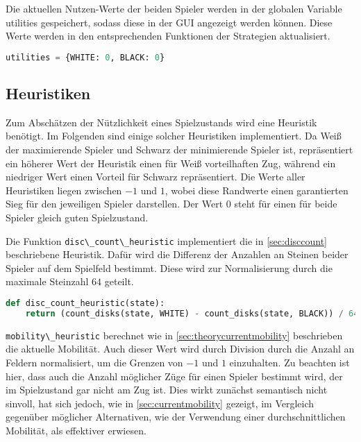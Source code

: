 Die aktuellen Nutzen-Werte der beiden Spieler werden in der globalen
Variable utilities gespeichert, sodass diese in der GUI angezeigt werden
können. Diese Werte werden in den entsprechenden Funktionen der
Strategien aktualisiert.

\begin{lstlisting}[language=Python]
utilities = {WHITE: 0, BLACK: 0}
\end{lstlisting}

\hypertarget{heuristiken}{%
\subsection{Heuristiken}\label{heuristiken}}

Zum Abschätzen der Nützlichkeit eines Spielzustands wird eine Heuristik
benötigt. Im Folgenden sind einige solcher Heuristiken implementiert. Da
Weiß der maximierende Spieler und Schwarz der minimierende Spieler ist,
repräsentiert ein höherer Wert der Heuristik einen für Weiß
vorteilhaften Zug, während ein niedriger Wert einen Vorteil für Schwarz
repräsentiert. Die Werte aller Heuristiken liegen zwischen \(-1\) und
\(1\), wobei diese Randwerte einen garantierten Sieg für den jeweiligen
Spieler darstellen. Der Wert \(0\) steht für einen für beide Spieler
gleich guten Spielzustand.

Die Funktion \passthrough{\lstinline!disc\_count\_heuristic!}
implementiert die in \ref{sec:disccount} beschriebene Heuristik. Dafür
wird die Differenz der Anzahlen an Steinen beider Spieler auf dem
Spielfeld bestimmt. Diese wird zur Normalisierung durch die maximale
Steinzahl \(64\) geteilt.

\begin{lstlisting}[language=Python]
def disc_count_heuristic(state):
    return (count_disks(state, WHITE) - count_disks(state, BLACK)) / 64
\end{lstlisting}

\passthrough{\lstinline!mobility\_heuristic!} berechnet wie in
\ref{sec:theorycurrentmobility} beschrieben die aktuelle Mobilität. Auch
dieser Wert wird durch Division durch die Anzahl an Feldern
normalisiert, um die Grenzen von \(-1\) und \(1\) einzuhalten. Zu
beachten ist hier, dass auch die Anzahl möglicher Züge für einen Spieler
bestimmt wird, der im Spielzustand gar nicht am Zug ist. Dies wirkt
zunächst semantisch nicht sinvoll, hat sich jedoch, wie in
\ref{sec:currentmobility} gezeigt, im Vergleich gegenüber möglicher
Alternativen, wie der Verwendung einer durchschnittlichen Mobilität, als
effektiver erwiesen.

